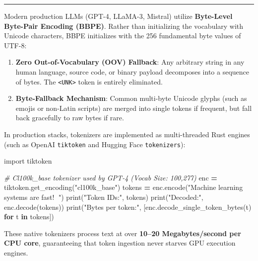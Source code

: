 \documentclass[
  letterpaper,
]{scrbook}
\newenvironment{Shaded}{\begin{snugshade}}{\end{snugshade}}
\newcommand{\BuiltInTok}[1]{#1}
\newcommand{\CommentTok}[1]{\textcolor[rgb]{0.56,0.35,0.01}{\textit{#1}}}
\newcommand{\ControlFlowTok}[1]{\textcolor[rgb]{0.13,0.29,0.53}{\textbf{#1}}}
\newcommand{\ImportTok}[1]{#1}
\newcommand{\KeywordTok}[1]{\textcolor[rgb]{0.13,0.29,0.53}{\textbf{#1}}}
\newcommand{\NormalTok}[1]{#1}
\newcommand{\OperatorTok}[1]{\textcolor[rgb]{0.81,0.36,0.00}{\textbf{#1}}}
\newcommand{\StringTok}[1]{\textcolor[rgb]{0.31,0.60,0.02}{#1}}
\providecommand{\tightlist}{%
  \setlength{\itemsep}{0pt}\setlength{\parskip}{0pt}}
\begin{document}
\begin{center}\rule{0.5\linewidth}{0.5pt}\end{center}

\begin{tcolorbox}[enhanced jigsaw, arc=.35mm, bottomrule=.15mm, bottomtitle=1mm, breakable, colback=white, colbacktitle=quarto-callout-note-color!10!white, colframe=quarto-callout-note-color-frame, coltitle=black, left=2mm, leftrule=.75mm, opacityback=0, opacitybacktitle=0.6, rightrule=.15mm, title=\textcolor{quarto-callout-note-color}{\faInfo}\hspace{0.5em}{Production Systems Bridge: OpenAI \texttt{tiktoken}, Byte-Level BPE, and
Rust Tokenizers}, titlerule=0mm, toprule=.15mm, toptitle=1mm]

Modern production LLMs (GPT-4, LLaMA-3, Mistral) utilize
\textbf{Byte-Level Byte-Pair Encoding (BBPE)}. Rather than initializing
the vocabulary with Unicode characters, BBPE initializes with the 256
fundamental byte values of UTF-8:

\begin{enumerate}
\def\labelenumi{\arabic{enumi}.}
\tightlist
\item
  \textbf{Zero Out-of-Vocabulary (OOV) Fallback}: Any arbitrary string
  in any human language, source code, or binary payload decomposes into
  a sequence of bytes. The \texttt{\textless{}UNK\textgreater{}} token
  is entirely eliminated.
\item
  \textbf{Byte-Fallback Mechanism}: Common multi-byte Unicode glyphs
  (such as emojis or non-Latin scripts) are merged into single tokens if
  frequent, but fall back gracefully to raw bytes if rare.
\end{enumerate}

In production stacks, tokenizers are implemented as multi-threaded Rust
engines (such as OpenAI \texttt{tiktoken} and Hugging Face
\texttt{tokenizers}):\footnotemark{}

\begin{Shaded}
\begin{Highlighting}[]
\ImportTok{import}\NormalTok{ tiktoken}

\CommentTok{\# Cl100k\_base tokenizer used by GPT{-}4 (Vocab Size: 100,277)}
\NormalTok{enc }\OperatorTok{=}\NormalTok{ tiktoken.get\_encoding(}\StringTok{"cl100k\_base"}\NormalTok{)}
\NormalTok{tokens }\OperatorTok{=}\NormalTok{ enc.encode(}\StringTok{"Machine learning systems are fast! 🚀"}\NormalTok{)}
\BuiltInTok{print}\NormalTok{(}\StringTok{"Token IDs:"}\NormalTok{, tokens)}
\BuiltInTok{print}\NormalTok{(}\StringTok{"Decoded:"}\NormalTok{, enc.decode(tokens))}
\BuiltInTok{print}\NormalTok{(}\StringTok{"Bytes per token:"}\NormalTok{, [enc.decode\_single\_token\_bytes(t) }\ControlFlowTok{for}\NormalTok{ t }\KeywordTok{in}\NormalTok{ tokens])}
\end{Highlighting}
\end{Shaded}

These native tokenizers process text at over \textbf{10--20
Megabytes/second per CPU core}, guaranteeing that token ingestion never
starves GPU execution engines.

\end{tcolorbox}
\end{document}
